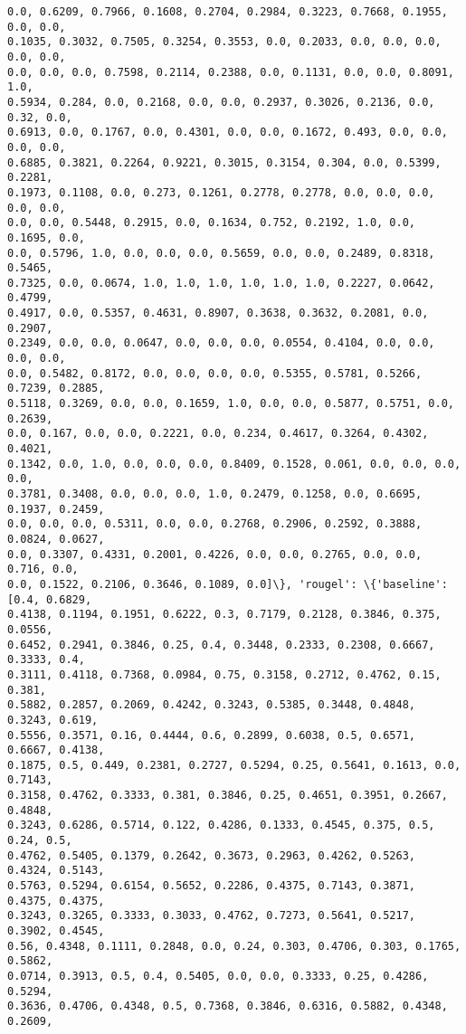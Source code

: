 \documentclass[11pt]{article}
\begin{document}
\begin{Verbatim}[commandchars=\\\{\}]
0.0, 0.6209, 0.7966, 0.1608, 0.2704, 0.2984, 0.3223, 0.7668, 0.1955, 0.0, 0.0,
0.1035, 0.3032, 0.7505, 0.3254, 0.3553, 0.0, 0.2033, 0.0, 0.0, 0.0, 0.0, 0.0,
0.0, 0.0, 0.0, 0.7598, 0.2114, 0.2388, 0.0, 0.1131, 0.0, 0.0, 0.8091, 1.0,
0.5934, 0.284, 0.0, 0.2168, 0.0, 0.0, 0.2937, 0.3026, 0.2136, 0.0, 0.32, 0.0,
0.6913, 0.0, 0.1767, 0.0, 0.4301, 0.0, 0.0, 0.1672, 0.493, 0.0, 0.0, 0.0, 0.0,
0.6885, 0.3821, 0.2264, 0.9221, 0.3015, 0.3154, 0.304, 0.0, 0.5399, 0.2281,
0.1973, 0.1108, 0.0, 0.273, 0.1261, 0.2778, 0.2778, 0.0, 0.0, 0.0, 0.0, 0.0,
0.0, 0.0, 0.5448, 0.2915, 0.0, 0.1634, 0.752, 0.2192, 1.0, 0.0, 0.1695, 0.0,
0.0, 0.5796, 1.0, 0.0, 0.0, 0.0, 0.5659, 0.0, 0.0, 0.2489, 0.8318, 0.5465,
0.7325, 0.0, 0.0674, 1.0, 1.0, 1.0, 1.0, 1.0, 1.0, 0.2227, 0.0642, 0.4799,
0.4917, 0.0, 0.5357, 0.4631, 0.8907, 0.3638, 0.3632, 0.2081, 0.0, 0.2907,
0.2349, 0.0, 0.0, 0.0647, 0.0, 0.0, 0.0, 0.0554, 0.4104, 0.0, 0.0, 0.0, 0.0,
0.0, 0.5482, 0.8172, 0.0, 0.0, 0.0, 0.0, 0.5355, 0.5781, 0.5266, 0.7239, 0.2885,
0.5118, 0.3269, 0.0, 0.0, 0.1659, 1.0, 0.0, 0.0, 0.5877, 0.5751, 0.0, 0.2639,
0.0, 0.167, 0.0, 0.0, 0.2221, 0.0, 0.234, 0.4617, 0.3264, 0.4302, 0.4021,
0.1342, 0.0, 1.0, 0.0, 0.0, 0.0, 0.8409, 0.1528, 0.061, 0.0, 0.0, 0.0, 0.0,
0.3781, 0.3408, 0.0, 0.0, 0.0, 1.0, 0.2479, 0.1258, 0.0, 0.6695, 0.1937, 0.2459,
0.0, 0.0, 0.0, 0.5311, 0.0, 0.0, 0.2768, 0.2906, 0.2592, 0.3888, 0.0824, 0.0627,
0.0, 0.3307, 0.4331, 0.2001, 0.4226, 0.0, 0.0, 0.2765, 0.0, 0.0, 0.716, 0.0,
0.0, 0.1522, 0.2106, 0.3646, 0.1089, 0.0]\}, 'rougel': \{'baseline': [0.4, 0.6829,
0.4138, 0.1194, 0.1951, 0.6222, 0.3, 0.7179, 0.2128, 0.3846, 0.375, 0.0556,
0.6452, 0.2941, 0.3846, 0.25, 0.4, 0.3448, 0.2333, 0.2308, 0.6667, 0.3333, 0.4,
0.3111, 0.4118, 0.7368, 0.0984, 0.75, 0.3158, 0.2712, 0.4762, 0.15, 0.381,
0.5882, 0.2857, 0.2069, 0.4242, 0.3243, 0.5385, 0.3448, 0.4848, 0.3243, 0.619,
0.5556, 0.3571, 0.16, 0.4444, 0.6, 0.2899, 0.6038, 0.5, 0.6571, 0.6667, 0.4138,
0.1875, 0.5, 0.449, 0.2381, 0.2727, 0.5294, 0.25, 0.5641, 0.1613, 0.0, 0.7143,
0.3158, 0.4762, 0.3333, 0.381, 0.3846, 0.25, 0.4651, 0.3951, 0.2667, 0.4848,
0.3243, 0.6286, 0.5714, 0.122, 0.4286, 0.1333, 0.4545, 0.375, 0.5, 0.24, 0.5,
0.4762, 0.5405, 0.1379, 0.2642, 0.3673, 0.2963, 0.4262, 0.5263, 0.4324, 0.5143,
0.5763, 0.5294, 0.6154, 0.5652, 0.2286, 0.4375, 0.7143, 0.3871, 0.4375, 0.4375,
0.3243, 0.3265, 0.3333, 0.3033, 0.4762, 0.7273, 0.5641, 0.5217, 0.3902, 0.4545,
0.56, 0.4348, 0.1111, 0.2848, 0.0, 0.24, 0.303, 0.4706, 0.303, 0.1765, 0.5862,
0.0714, 0.3913, 0.5, 0.4, 0.5405, 0.0, 0.0, 0.3333, 0.25, 0.4286, 0.5294,
0.3636, 0.4706, 0.4348, 0.5, 0.7368, 0.3846, 0.6316, 0.5882, 0.4348, 0.2609,

\end{Verbatim}
\end{document}
